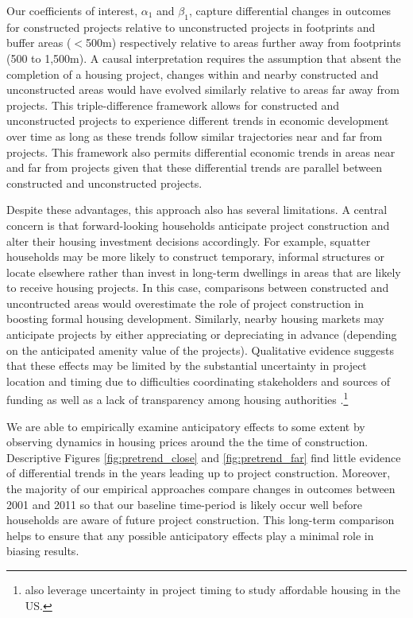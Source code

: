 \documentclass[12pt]{article}
\begin{document}
Our coefficients of interest, $\alpha_1$ and $\beta_1$, capture differential changes in outcomes for constructed projects relative to unconstructed projects in footprints and buffer areas ($<$500m) respectively relative to areas further away from footprints (500 to 1,500m).  A causal interpretation requires the assumption that absent the completion of a housing project, changes within and nearby constructed and unconstructed areas would have evolved similarly relative to areas far away from projects.  This triple-difference framework allows for constructed and unconstructed projects to experience different trends in economic development over time as long as these trends follow similar trajectories near and far from projects.  This framework also permits differential economic trends in areas near and far from projects given that these differential trends are parallel between constructed and unconstructed projects.

Despite these advantages, this approach also has several limitations.  A central concern is that forward-looking households anticipate project construction and alter their housing investment decisions accordingly.  For example, squatter households may be more likely to construct temporary, informal structures or locate elsewhere rather than invest in long-term dwellings in areas that are likely to receive housing projects.  In this case, comparisons between constructed and uncontructed areas would overestimate the role of project construction in boosting formal housing development.  Similarly, nearby housing markets may anticipate projects by either appreciating or depreciating in advance (depending on the anticipated amenity value of the projects).  Qualitative evidence suggests that these effects may be limited by the substantial uncertainty in project location and timing due to difficulties coordinating stakeholders and sources of funding as well as a lack of transparency among housing authorities \citep{serihistory}.\footnote{\cite{diamond2016wants} also leverage uncertainty in project timing to study affordable housing in the US.} 

We are able to empirically examine anticipatory effects to some extent by observing dynamics in housing prices around the the time of construction.  Descriptive Figures \ref{fig:pretrend_close} and \ref{fig:pretrend_far} find little evidence of differential trends in the years leading up to project construction.   Moreover, the majority of our empirical approaches compare changes in outcomes between 2001 and 2011 so that our baseline time-period is likely occur well before households are aware of future project construction.  This long-term comparison helps to ensure that any possible anticipatory effects play a minimal role in biasing results.  
\end{document}
